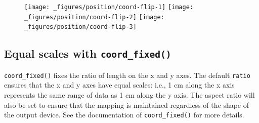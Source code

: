\begin{Shaded}
\begin{Highlighting}[]
\OperatorTok{+}\StringTok{ }
\StringTok{  }\NormalTok{() }\OperatorTok{+}\StringTok{ }
\StringTok{  }\NormalTok{()}
\OperatorTok{+}\StringTok{ }
\StringTok{  }\NormalTok{() }\OperatorTok{+}\StringTok{ }
\StringTok{  }\NormalTok{()}
\OperatorTok{+}\StringTok{ }
\StringTok{  }\NormalTok{() }\OperatorTok{+}\StringTok{ }
\StringTok{  }\NormalTok{() }\OperatorTok{+}\StringTok{ }
\StringTok{  }\NormalTok{()}
\end{Highlighting}
\end{Shaded}

\begin{figure}[H]
  \texttt{[image: \_figures/position/coord-flip-1]}%
  \texttt{[image: \_figures/position/coord-flip-2]}%
  \texttt{[image: \_figures/position/coord-flip-3]}
\end{figure}

\hypertarget{equal-scales-with-coord_fixed}{%
\subsection{\texorpdfstring{Equal scales with
\texttt{coord\_fixed()}}{Equal scales with coord\_fixed()}}\label{equal-scales-with-coord_fixed}}

\texttt{coord\_fixed()} fixes the ratio of length on the x and y axes.
The default \texttt{ratio} ensures that the x and y axes have equal
scales: i.e., 1 cm along the x axis represents the same range of data as
1 cm along the y axis. The aspect ratio will also be set to ensure that
the mapping is maintained regardless of the shape of the output device.
See the documentation of \texttt{coord\_fixed()} for more details.
 

